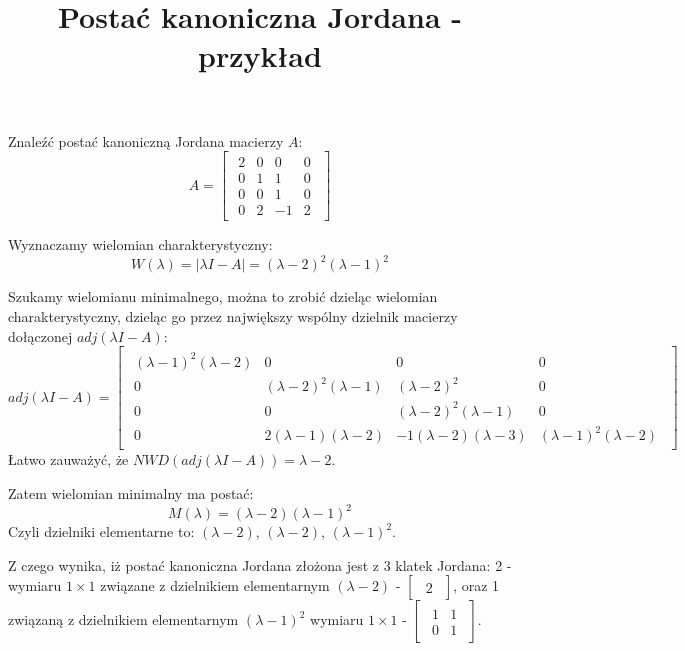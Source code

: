 \documentclass{article}
\title{Postać kanoniczna Jordana - przykład}
\begin{document}
\maketitle

Znaleźć postać kanoniczną Jordana macierzy $A$:
$$
    A
    =
    \begin{bmatrix}\begin{array}{rrrr}
        2   &   0   &   0   &   0\\
        0   &   1   &   1   &   0\\
        0   &   0   &   1   &   0\\
        0   &   2   &  -1   &   2
    \end{array}\end{bmatrix}
$$

Wyznaczamy wielomian charakterystyczny:
$$
    W(\lambda) = |\lambda I - A| = (\lambda - 2)^{2}(\lambda - 1)^{2}
$$

Szukamy wielomianu minimalnego, można to zrobić dzieląc wielomian charakterystyczny, dzieląc go przez największy wspólny dzielnik macierzy dołączonej $adj(\lambda I - A)$:
$$
    adj(\lambda I - A)
    =
    \begin{bmatrix}\begin{array}{cccc}
        (\lambda - 1)^{2}(\lambda - 2)  &   0                               &   0                               &   0\\
        0                               &   (\lambda - 2)^{2}(\lambda - 1)  &   (\lambda - 2)^{2}               &   0\\
        0                               &   0                               &   (\lambda - 2)^{2}(\lambda - 1)  &   0\\
        0                               &   2(\lambda - 1)(\lambda - 2)     &  -1(\lambda - 2)(\lambda - 3)     &   (\lambda - 1)^{2}(\lambda - 2)
    \end{array}\end{bmatrix}
$$
Łatwo zauważyć, że $NWD(adj(\lambda I - A)) = \lambda - 2$.

Zatem wielomian minimalny ma postać:
$$
    M(\lambda) = (\lambda - 2)(\lambda - 1)^{2}
$$
Czyli dzielniki elementarne to: $(\lambda - 2)$, $(\lambda - 2)$, $(\lambda - 1)^{2}$.

Z czego wynika, iż postać kanoniczna Jordana złożona jest z 3 klatek Jordana: 2 - wymiaru $1 \times 1$ związane z dzielnikiem elementarnym $(\lambda - 2)$ - $\begin{bmatrix}\begin{array}{c} 2 \end{array}\end{bmatrix}$, oraz 1 związaną z dzielnikiem elementarnym $(\lambda - 1)^{2}$ wymiaru $1 \times 1$ - $\begin{bmatrix}\begin{array}{cc} 1 & 1\\ 0 & 1 \end{array}\end{bmatrix}$.
\end{document}

